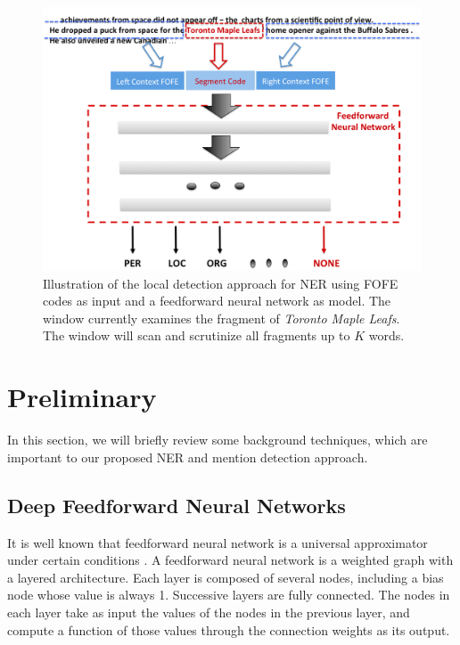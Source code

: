 \documentclass[11pt,a4paper]{article}
\begin{document}
\begin{figure}[t]
	\centering
	\includegraphics[width=0.8\linewidth]{Figure-Diagram.png}
	\caption{Illustration of the local detection approach for NER using FOFE codes as input and a feedforward neural network as model. The window currently examines the fragment of {\it Toronto Maple Leafs}. The window will scan and scrutinize all fragments up to $K$ words. }
	\label{Fig:FOFE-NER-diagram}
\end{figure}


\section{Preliminary}

In this section, we will briefly review some background techniques, which are important to our proposed NER and mention detection approach. 

\subsection{Deep Feedforward Neural Networks}

It is well known that feedforward neural network is a universal approximator under certain conditions \cite{hornik1991approximation}.
A feedforward neural network is a weighted graph with a layered architecture.
Each layer is composed of several nodes, including a bias node whose value is always 1.
Successive layers are fully connected. The nodes in each layer
take as input the values of the nodes in the previous layer, and
compute a function of those values through the connection weights as its
output.
\end{document}
